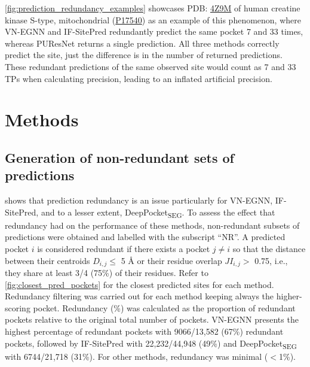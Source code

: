 \autoref{fig:prediction_redundancy_examples} showcases PDB: \href{https://www.ebi.ac.uk/pdbe/entry/pdb/4z9m}{4Z9M} of human creatine kinase S-type, mitochondrial (\href{https://www.uniprot.org/uniprotkb/P17540/entry}{P17540}) as an example of this phenomenon, where VN-EGNN and IF-SitePred redundantly predict the same pocket 7 and 33 times, whereas PUResNet returns a single prediction. All three methods correctly predict the site, just the difference is in the number of returned predictions. These redundant predictions of the same observed site would count as 7 and 33 TPs when calculating precision, leading to an inflated artificial precision.

\section{Methods}

\subsection{Generation of non-redundant sets of predictions}

 shows that prediction redundancy is an issue particularly for VN-EGNN, IF-SitePred, and to a lesser extent, DeepPocket\textsubscript{SEG}. To assess the effect that redundancy had on the performance of these methods, non-redundant subsets of predictions were obtained and labelled with the subscript ``NR''. A predicted pocket $i$ is considered redundant if there exists a pocket $j \neq i$ so that the distance between their centroids $D_{i,j} \leq$ 5 \AA{} or their residue overlap $JI_{i,j} >$ 0.75, i.e., they share at least 3/4 (75\%) of their residues. Refer to \autoref{fig:closest_pred_pockets} for the closest predicted sites for each method. Redundancy filtering was carried out for each method keeping always the higher-scoring pocket. Redundancy (\%) was calculated as the proportion of redundant pockets relative to the original total number of pockets. VN-EGNN presents the highest percentage of redundant pockets with 9066/13,582 (67\%) redundant pockets, followed by IF-SitePred with 22,232/44,948 (49\%) and DeepPocket\textsubscript{SEG} with 6744/21,718 (31\%). For other methods, redundancy was minimal ($<$1\%).

